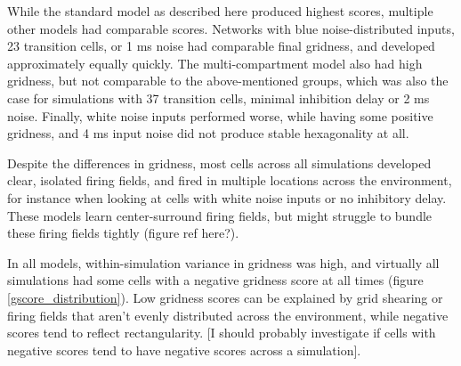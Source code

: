 \documentclass{article}
\begin{document}
    While the standard model as described here produced highest scores, multiple other models had comparable scores. Networks with blue noise-distributed inputs, 23 transition cells, or 1 ms noise had comparable final gridness, and developed approximately equally quickly. The multi-compartment model also had high gridness, but not comparable to the above-mentioned groups, which was also the case for simulations with 37 transition cells, minimal inhibition delay or 2 ms noise. Finally, white noise inputs performed worse, while having some positive gridness, and 4 ms input noise did not produce stable hexagonality at all.
    
    Despite the differences in gridness, most cells across all simulations developed clear, isolated firing fields, and fired in multiple locations across the environment, for instance when looking at cells with white noise inputs or no inhibitory delay. These models learn center-surround firing fields, but might struggle to bundle these firing fields tightly (figure ref here?). 

    In all models, within-simulation variance in gridness was high, and virtually all simulations had some cells with a negative gridness score at all times (figure \ref{gscore_distribution}). Low gridness scores can be explained by grid shearing or firing fields that aren't evenly distributed across the environment, while negative scores tend to reflect rectangularity. [I should probably investigate if cells with negative scores tend to have negative scores across a simulation].
\end{document}
